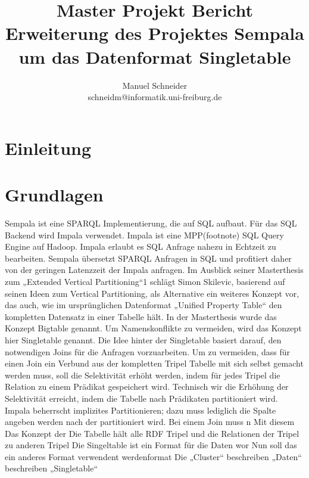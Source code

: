 \documentclass[
  a4paper,
  twocolumn
]{scrartcl}
\begin{document}
\title{Master Projekt Bericht\\[1em] \large Erweiterung des Projektes Sempala um das Datenformat Singletable}
\author{Manuel Schneider\\schneidm@informatik.uni-freiburg.de}
\maketitle


\section{Einleitung}

\lipsum[1-2]

\section{Grundlagen}

Sempala ist eine SPARQL Implementierung, die auf SQL aufbaut. Für das SQL Backend wird Impala verwendet. Impala ist eine MPP(footnote) SQL Query Engine auf Hadoop. Impala erlaubt es SQL Anfrage nahezu in Echtzeit zu bearbeiten. Sempala übersetzt SPARQL Anfragen in SQL und profitiert daher von der geringen Latenzzeit der Impala anfragen.
Im Ausblick seiner Masterthesis zum „Extended Vertical Partitioning“1 schlägt Simon Skilevic, basierend auf seinen Ideen zum Vertical Partitioning, als Alternative ein weiteres Konzept vor, das auch, wie im ursprünglichen Datenformat „Unified Property Table“ den kompletten Datensatz in einer Tabelle hält. In der Masterthesis wurde das Konzept Bigtable genannt. Um Namenskonflikte zu vermeiden, wird das Konzept hier Singletable genannt.
Die Idee hinter der Singletable basiert darauf, den notwendigen Joins für die Anfragen vorzuarbeiten. Um zu vermeiden, dass für einen Join ein Verbund aus der kompletten Tripel Tabelle mit sich selbst gemacht werden muss, soll die Selektivität erhöht werden, indem für jedes Tripel die Relation zu einem Prädikat gespeichert wird.
Technisch wir die Erhöhung der Selektivität erreicht, indem die Tabelle nach Prädikaten partitioniert wird. Impala beherrscht implizites Partitionieren; dazu muss lediglich die Spalte angeben werden nach der partitioniert wird. Bei einem Join muss n Mit diesem 
Das Konzept der 
 Die Tabelle hält alle RDF Tripel und die Relationen der Tripel zu anderen Tripel
Die Singeltable ist ein Format für die Daten wor
Nun soll das ein anderes Format verwendent werdenformat
Die 
„Cluster“ beschreiben
„Daten“ beschreiben
„Singletable“
\end{document}
